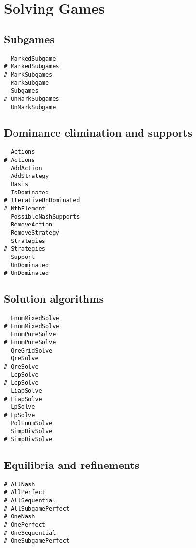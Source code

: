 \section{Solving Games}

\subsection{Subgames}

\begin{multicols}{3}
\begin{verbatim}
  MarkedSubgame 
# MarkedSubgames 
# MarkSubgames 
  MarkSubgame 
  Subgames 
# UnMarkSubgames 
  UnMarkSubgame 
\end{verbatim}
\end{multicols}

\subsection{Dominance elimination and supports}

\begin{multicols}{3}
\begin{verbatim}
  Actions
# Actions
  AddAction
  AddStrategy
  Basis
  IsDominated
# IterativeUnDominated
# NthElement
  PossibleNashSupports
  RemoveAction
  RemoveStrategy
  Strategies 
# Strategies 
  Support 
  UnDominated
# UnDominated
\end{verbatim}
\end{multicols}

\subsection{Solution algorithms}

\begin{multicols}{3}
\begin{verbatim}
  EnumMixedSolve 
# EnumMixedSolve 
  EnumPureSolve 
# EnumPureSolve 
  QreGridSolve 
  QreSolve 
# QreSolve 
  LcpSolve 
# LcpSolve 
  LiapSolve 
# LiapSolve 
  LpSolve 
# LpSolve 
  PolEnumSolve
  SimpDivSolve 
# SimpDivSolve 
\end{verbatim}
\end{multicols}

\subsection{Equilibria and refinements}

\begin{multicols}{3}
\begin{verbatim}
# AllNash
# AllPerfect
# AllSequential 
# AllSubgamePerfect
# OneNash
# OnePerfect
# OneSequential
# OneSubgamePerfect
\end{verbatim}
\end{multicols}

